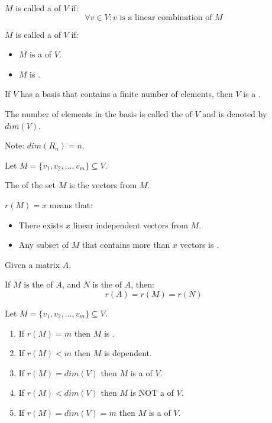     \par $M$ is called a  of $V$ if:
    \[
      \forall v \in V: v \mbox{ is a linear combination of } M
    \]

    \par $M$ is called a  of $V$ if:
    \begin{itemize}
      \item $M$ is a  of $V$.
      \item $M$ is .
    \end{itemize}

    \par If $V$ has a basis that contains a finite number of elements, then
      $V$ is a .
    \par The number of elements in the basis is called the  of
      $V$ and is denoted by $dim(V)$.
    \par Note: $dim(R_{n}) = n$.


    \par Let $M = \{v_{1}, v_{2}, \ldots, v_{m}\} \subseteq V$.
    \par The  of the set $M$ is the  vectors from $M$.
    \par $r(M) = x$ means that:
    \begin{itemize}
      \item There exists $x$ linear independent vectors from $M$.
      \item Any subset of $M$ that contains more than $x$ vectors
      is .
    \end{itemize}

    \par Given a matrix $A$.
    \par If $M$ is the  of $A$, and
            $N$ is the  of $A$, then:
    \[
      r(A) = r(M) = r(N)
    \]

    \par Let $M = \{v_{1}, v_{2}, \ldots, v_{m}\} \subseteq V$.
    \begin{enumerate}
      \item If $r(M) = m$ then $M$ is .
      \item If $r(M) < m$ then $M$ is dependent.
      \item If $r(M) = dim(V)$ then $M$ is a  of $V$.
      \item If $r(M) < dim(V)$ then $M$ is NOT a  of $V$.
      \item If $r(M) = dim(V) = m$ then $M$ is a  of $V$.
    \end{enumerate}


